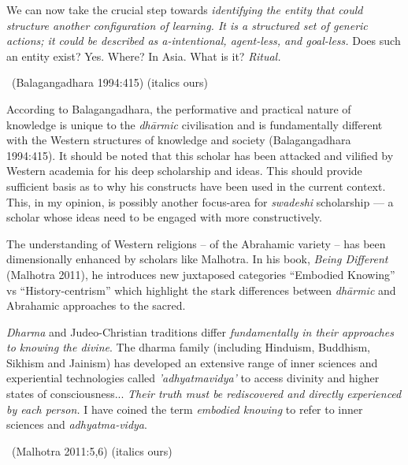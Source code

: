 \begin{myquote}
We can now take the crucial step towards \textit{identifying the entity that could structure another configuration of learning. It is a structured set of generic actions; it could be described as a-intentional, agent-less, and goal-less.} Does such an entity exist? Yes. Where? In Asia. What is it? \textit{Ritual.} 

~\hfill (Balagangadhara 1994:415) (italics ours)
\end{myquote}

According to Balagangadhara, the performative and practical nature of knowledge is unique to the \textit{dhārmic} civilisation and is fundamentally different with the Western structures of knowledge and society (Balagangadhara 1994:415). It should be noted that this scholar has been attacked and vilified by Western academia for his deep scholarship and ideas. This should provide sufficient basis as to why his constructs have been used in the current context. This, in my opinion, is possibly another focus-area for \textit{swadeshi} scholarship — a scholar whose ideas need to be engaged with more constructively.

The understanding of Western religions – of the Abrahamic variety – has been dimensionally enhanced by scholars like Malhotra. In his book, \textit{Being Different} (Malhotra 2011), he introduces new juxtaposed categories “Embodied Knowing” vs “History-centrism” which highlight the stark differences between \textit{dhārmic} and Abrahamic approaches to the sacred.

\begin{myquote}
\textit{Dharma} and Judeo-Christian traditions differ \textit{fundamentally in their approaches to knowing the divine}. The dharma family (including Hinduism, Buddhism, Sikhism and Jainism) has developed an extensive range of inner sciences and experiential technologies called \textit{'adhyatmavidya'} to access divinity and higher states of consciousness... \textit{Their truth must be rediscovered and directly experienced by each person.} I have coined the term \textit{embodied knowing} to refer to inner sciences and \textit{adhyatma-vidya}. 

~\hfill (Malhotra 2011:5,6) (italics ours)
\end{myquote}

